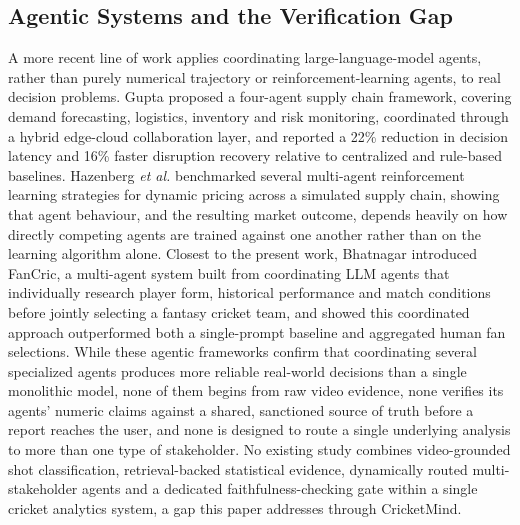 \subsection{Agentic Systems and the Verification Gap}
\label{subsec:verificationgap}
A more recent line of work applies coordinating large-language-model agents, rather than purely numerical trajectory or reinforcement-learning agents, to real decision problems. Gupta \cite{ref6} proposed a four-agent supply chain framework, covering demand forecasting, logistics, inventory and risk monitoring, coordinated through a hybrid edge-cloud collaboration layer, and reported a 22\% reduction in decision latency and 16\% faster disruption recovery relative to centralized and rule-based baselines. Hazenberg \textit{et al.} \cite{ref7} benchmarked several multi-agent reinforcement learning strategies for dynamic pricing across a simulated supply chain, showing that agent behaviour, and the resulting market outcome, depends heavily on how directly competing agents are trained against one another rather than on the learning algorithm alone. Closest to the present work, Bhatnagar \cite{ref8} introduced FanCric, a multi-agent system built from coordinating LLM agents that individually research player form, historical performance and match conditions before jointly selecting a fantasy cricket team, and showed this coordinated approach outperformed both a single-prompt baseline and aggregated human fan selections. While these agentic frameworks confirm that coordinating several specialized agents produces more reliable real-world decisions than a single monolithic model, none of them begins from raw video evidence, none verifies its agents' numeric claims against a shared, sanctioned source of truth before a report reaches the user, and none is designed to route a single underlying analysis to more than one type of stakeholder. No existing study combines video-grounded shot classification, retrieval-backed statistical evidence, dynamically routed multi-stakeholder agents and a dedicated faithfulness-checking gate within a single cricket analytics system, a gap this paper addresses through CricketMind.